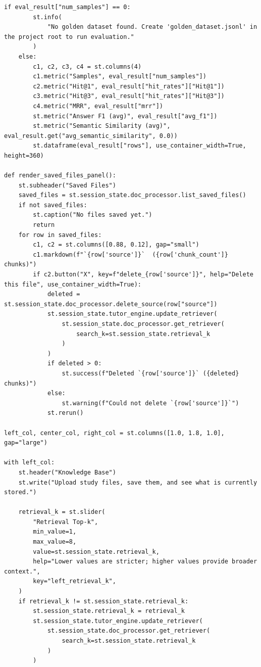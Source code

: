\documentclass[12pt,a4paper]{article}
\begin{document}
\begin{lstlisting}[caption={evaluation.py}]
    if eval_result["num_samples"] == 0:
        st.info(
            "No golden dataset found. Create 'golden_dataset.jsonl' in the project root to run evaluation."
        )
    else:
        c1, c2, c3, c4 = st.columns(4)
        c1.metric("Samples", eval_result["num_samples"])
        c2.metric("Hit@1", eval_result["hit_rates"]["Hit@1"])
        c3.metric("Hit@3", eval_result["hit_rates"]["Hit@3"])
        c4.metric("MRR", eval_result["mrr"])
        st.metric("Answer F1 (avg)", eval_result["avg_f1"])
        st.metric("Semantic Similarity (avg)", eval_result.get("avg_semantic_similarity", 0.0))
        st.dataframe(eval_result["rows"], use_container_width=True, height=360)

def render_saved_files_panel():
    st.subheader("Saved Files")
    saved_files = st.session_state.doc_processor.list_saved_files()
    if not saved_files:
        st.caption("No files saved yet.")
        return
    for row in saved_files:
        c1, c2 = st.columns([0.88, 0.12], gap="small")
        c1.markdown(f"`{row['source']}`  ({row['chunk_count']} chunks)")
        if c2.button("X", key=f"delete_{row['source']}", help="Delete this file", use_container_width=True):
            deleted = st.session_state.doc_processor.delete_source(row["source"])
            st.session_state.tutor_engine.update_retriever(
                st.session_state.doc_processor.get_retriever(
                    search_k=st.session_state.retrieval_k
                )
            )
            if deleted > 0:
                st.success(f"Deleted `{row['source']}` ({deleted} chunks)")
            else:
                st.warning(f"Could not delete `{row['source']}`")
            st.rerun()

left_col, center_col, right_col = st.columns([1.0, 1.8, 1.0], gap="large")

with left_col:
    st.header("Knowledge Base")
    st.write("Upload study files, save them, and see what is currently stored.")

    retrieval_k = st.slider(
        "Retrieval Top-k",
        min_value=1,
        max_value=8,
        value=st.session_state.retrieval_k,
        help="Lower values are stricter; higher values provide broader context.",
        key="left_retrieval_k",
    )
    if retrieval_k != st.session_state.retrieval_k:
        st.session_state.retrieval_k = retrieval_k
        st.session_state.tutor_engine.update_retriever(
            st.session_state.doc_processor.get_retriever(
                search_k=st.session_state.retrieval_k
            )
        )


\end{lstlisting}
\end{document}
